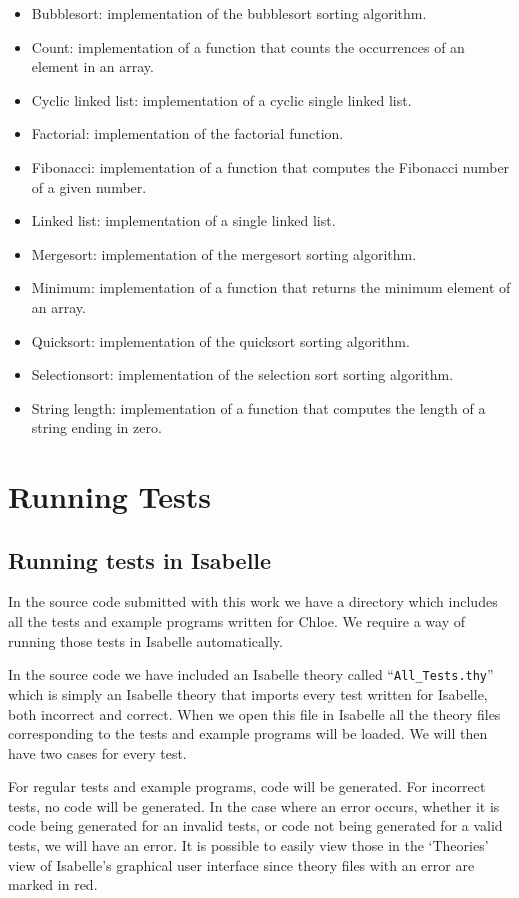 \begin{itemize}
  \item{Bubblesort: implementation of the bubblesort sorting algorithm.}
  \item{Count: implementation of a function that counts the occurrences of an element in an array.}
  \item{Cyclic linked list: implementation of a cyclic single linked list.}
  \item{Factorial: implementation of the factorial function.}
  \item{Fibonacci: implementation of a function that computes the Fibonacci number of a given number.}
  \item{Linked list: implementation of a single linked list.}
  \item{Mergesort: implementation of the mergesort sorting algorithm.}
  \item{Minimum: implementation of a function that returns the minimum element of an array.}
  \item{Quicksort: implementation of the quicksort sorting algorithm.}
  \item{Selectionsort: implementation of the selection sort sorting algorithm.}
  \item{String length: implementation of a function that computes the length of a string ending in zero.}
\end{itemize}

\section{Running Tests}

\subsection{Running tests in Isabelle}

In the source code submitted with this work we have a directory which includes all the tests and example programs written for Chloe.
We require a way of running those tests in Isabelle automatically.

In the source code we have included an Isabelle theory called ``\verb|All_Tests.thy|'' which is simply an Isabelle theory that imports every test written for Isabelle, both incorrect and correct.
When we open this file in Isabelle all the theory files corresponding to the tests and example programs will be loaded.
We will then have two cases for every test.

For regular tests and example programs, code will be generated.
For incorrect tests, no code will be generated.
In the case where an error occurs, whether it is code being generated for an invalid tests, or code not being generated for a valid tests, we will have an error.
It is possible to easily view those in the `Theories' view of Isabelle's graphical user interface since theory files with an error are marked in red.


